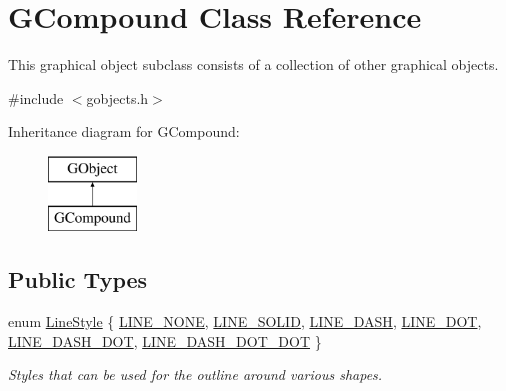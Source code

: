 \hypertarget{classGCompound}{}\section{G\+Compound Class Reference}
\label{classGCompound}


This graphical object subclass consists of a collection of other graphical objects.  




{\ttfamily \#include $<$gobjects.\+h$>$}

Inheritance diagram for G\+Compound\+:\begin{figure}[H]
\begin{center}
\leavevmode
\includegraphics[height=2.000000cm]{classGCompound}
\end{center}
\end{figure}
\subsection*{Public Types}
\begin{DoxyCompactItemize}
\item 
enum \mbox{\hyperlink{classGObject_a86e0f5648542856159bb40775c854aa7}{Line\+Style}} \{ \mbox{\hyperlink{classGObject_a86e0f5648542856159bb40775c854aa7acbc84bd5232621834ed31f44d457c1eb}{L\+I\+N\+E\+\_\+\+N\+O\+NE}}, 
\mbox{\hyperlink{classGObject_a86e0f5648542856159bb40775c854aa7a700c78bc2cd76acaab26651bf7b4941f}{L\+I\+N\+E\+\_\+\+S\+O\+L\+ID}}, 
\mbox{\hyperlink{classGObject_a86e0f5648542856159bb40775c854aa7a9ccba0845f785d81d07b333ae1aad84e}{L\+I\+N\+E\+\_\+\+D\+A\+SH}}, 
\mbox{\hyperlink{classGObject_a86e0f5648542856159bb40775c854aa7a8e811c096cb941997f0bfda168bb6df3}{L\+I\+N\+E\+\_\+\+D\+OT}}, 
\mbox{\hyperlink{classGObject_a86e0f5648542856159bb40775c854aa7ada15a2e3d737b2db7706d8300f91b89d}{L\+I\+N\+E\+\_\+\+D\+A\+S\+H\+\_\+\+D\+OT}}, 
\mbox{\hyperlink{classGObject_a86e0f5648542856159bb40775c854aa7aabf4053a73eafa7ba2b7e6d664c74c1d}{L\+I\+N\+E\+\_\+\+D\+A\+S\+H\+\_\+\+D\+O\+T\+\_\+\+D\+OT}}
 \}
\begin{DoxyCompactList}\small\item\em Styles that can be used for the outline around various shapes. \end{DoxyCompactList}\end{DoxyCompactItemize}
